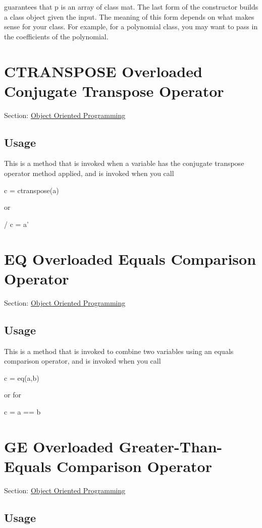  guarantees that {\ttfamily p} is an array of class {\ttfamily mat}. The last form of the constructor builds a class object given the input. The meaning of this form depends on what makes sense for your class. For example, for a polynomial class, you may want to pass in the coefficients of the polynomial. \hypertarget{class_ctranspose}{}\section{C\-T\-R\-A\-N\-S\-P\-O\-S\-E Overloaded Conjugate Transpose Operator}\label{class_ctranspose}
Section\-: \hyperlink{sec_class}{Object Oriented Programming} \hypertarget{vtkwidgets_vtkxyplotwidget_Usage}{}\subsection{Usage}\label{vtkwidgets_vtkxyplotwidget_Usage}
This is a method that is invoked when a variable has the conjugate transpose operator method applied, and is invoked when you call \begin{DoxyVerb}   c = ctranspose(a)
\end{DoxyVerb}
 or \begin{DoxyVerb}/  c = a'
\end{DoxyVerb}
 \hypertarget{class_eq}{}\section{E\-Q Overloaded Equals Comparison Operator}\label{class_eq}
Section\-: \hyperlink{sec_class}{Object Oriented Programming} \hypertarget{vtkwidgets_vtkxyplotwidget_Usage}{}\subsection{Usage}\label{vtkwidgets_vtkxyplotwidget_Usage}
This is a method that is invoked to combine two variables using an equals comparison operator, and is invoked when you call \begin{DoxyVerb}   c = eq(a,b)
\end{DoxyVerb}
 or for \begin{DoxyVerb}   c = a == b
\end{DoxyVerb}
 \hypertarget{class_ge}{}\section{G\-E Overloaded Greater-\/\-Than-\/\-Equals Comparison Operator}\label{class_ge}
Section\-: \hyperlink{sec_class}{Object Oriented Programming} \hypertarget{vtkwidgets_vtkxyplotwidget_Usage}{}\subsection{Usage}\label{vtkwidgets_vtkxyplotwidget_Usage}

